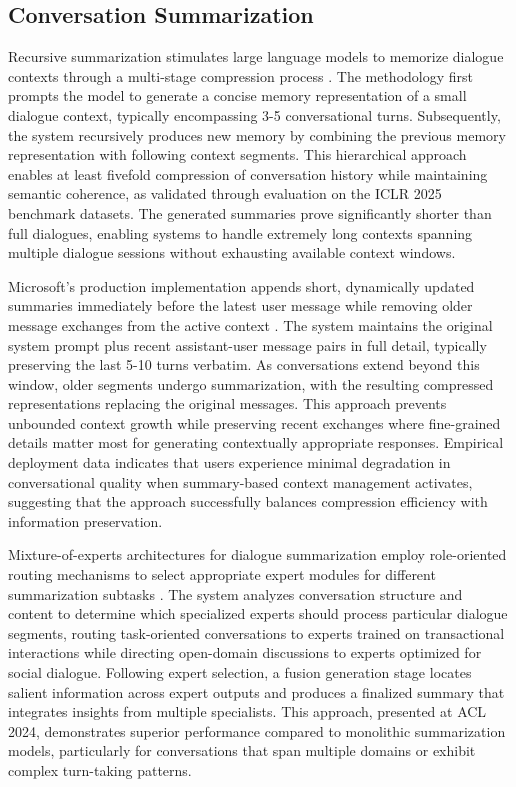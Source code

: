 \subsection{Conversation Summarization}

Recursive summarization stimulates large language models to memorize dialogue contexts through a multi-stage compression process \citep{wu2023recursively}. The methodology first prompts the model to generate a concise memory representation of a small dialogue context, typically encompassing 3-5 conversational turns. Subsequently, the system recursively produces new memory by combining the previous memory representation with following context segments. This hierarchical approach enables at least fivefold compression of conversation history while maintaining semantic coherence, as validated through evaluation on the ICLR 2025 benchmark datasets. The generated summaries prove significantly shorter than full dialogues, enabling systems to handle extremely long contexts spanning multiple dialogue sessions without exhausting available context windows.

Microsoft's production implementation appends short, dynamically updated summaries immediately before the latest user message while removing older message exchanges from the active context \citep{microsoft2024infinite}. The system maintains the original system prompt plus recent assistant-user message pairs in full detail, typically preserving the last 5-10 turns verbatim. As conversations extend beyond this window, older segments undergo summarization, with the resulting compressed representations replacing the original messages. This approach prevents unbounded context growth while preserving recent exchanges where fine-grained details matter most for generating contextually appropriate responses. Empirical deployment data indicates that users experience minimal degradation in conversational quality when summary-based context management activates, suggesting that the approach successfully balances compression efficiency with information preservation.

Mixture-of-experts architectures for dialogue summarization employ role-oriented routing mechanisms to select appropriate expert modules for different summarization subtasks \citep{wang2024dialogue}. The system analyzes conversation structure and content to determine which specialized experts should process particular dialogue segments, routing task-oriented conversations to experts trained on transactional interactions while directing open-domain discussions to experts optimized for social dialogue. Following expert selection, a fusion generation stage locates salient information across expert outputs and produces a finalized summary that integrates insights from multiple specialists. This approach, presented at ACL 2024, demonstrates superior performance compared to monolithic summarization models, particularly for conversations that span multiple domains or exhibit complex turn-taking patterns.

